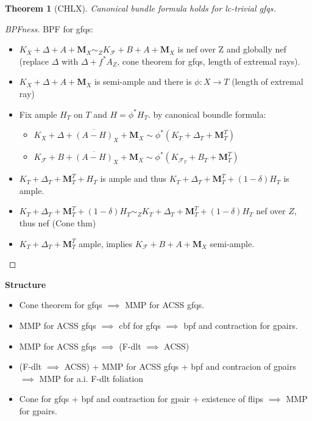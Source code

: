 \documentclass{article}
\newtheorem{theorem}[definition]{Theorem}
\begin{document}
\begin{theorem}[CHLX]
Canonical bundle formula holds for lc-trivial gfqs.
\end{theorem}
\begin{proof}[BPFness]
  BPF for gfqs:
 \begin{itemize}
  \item $ K_{X}+\Delta+A+\mathbf{M}_{X}\sim_{Z} K_{\mathcal{F}}+B+A+\mathbf{M}_{X} $ is nef over Z and globally nef (replace $ \Delta$ with $ \Delta + f^{*}A_{Z} $, cone theorem for gfqs, length of extremal rays).
  \item $ K_{X}+\Delta+A+\mathbf{M}_{X} $ is semi-ample and there is $ \phi:X\to T $ (length of extremal ray)
  \item Fix ample $H_{T}$ on $T$ and $ H=\phi^{*}H_{T} $. by canonical boundle formula:
    \begin{itemize}
      \item $ K_{X}+\Delta+ \overline{(A-H)}_{X}+\mathbf{M}_{X}\sim \phi^{*}(K_{T}+\Delta_{T}+\mathbf{M}^{T}_{T}) $
      \item $ K_{\mathcal{F}}+B+ \overline{(A-H)}_{X}+\mathbf{M}_{X}\sim \phi^{*}(K_{\mathcal{F}_{T}}+B_{T}+\mathbf{M}^{T}_{T}) $
    \end{itemize}
  \item $ K_{T}+\Delta_{T}+\mathbf{M}^{T}_{T}+H_{T} $ is ample and thus $ K_{T}+\Delta_{T}+\mathbf{M}^{T}_{T}+(1-\delta)H_{T} $  is  ample.
  \item $ K_{T}+\Delta_{T}+\mathbf{M}^{T}_{T}+(1-\delta)H_{T}\sim_{Z}K_{T}+\Delta_{T}+\mathbf{M}^{T}_{T}+(1-\delta)H_{T} $ nef over $Z$, thus nef (Cone thm) 
  \item $ K_{T}+\Delta_{T}+\mathbf{M}^{T}_{T}$ ample, implies $ K_{\mathcal{F}}+B+A+\mathbf{M}_{X} $ semi-ample. 
 \end{itemize} 
\end{proof}

\textbf{Structure}
\begin{itemize}
  \item Cone theorem for gfqs $ \implies $ MMP for ACSS gfqs.
  \item MMP for ACSS gfqs $ \implies $ cbf for gfqs $ \implies $ bpf and contraction for gpairs.
  \item MMP for ACSS gfqs $ \implies $ (F-dlt $ \implies $ ACSS)
  \item (F-dlt $ \implies $ ACSS) + MMP for ACSS gfqs + bpf and contracion of gpairs $ \implies $ MMP for a.i. F-dlt foliation
  \item Cone for gfqs + bpf and contraction for gpair + existence of flips $ \implies $ MMP for gpairs.
\end{itemize}
\end{document}
